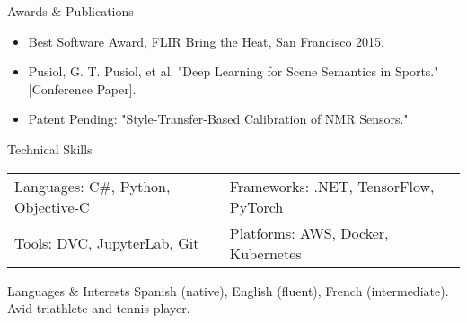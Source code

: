 \documentclass{resume}
\begin{document}
\begin{rSection}{Awards \& Publications}
\begin{itemize}
  \item Best Software Award, FLIR Bring the Heat, San Francisco 2015.
  \item Pusiol, G. T. Pusiol, et al. "Deep Learning for Scene Semantics in Sports." [Conference Paper].
  \item Patent Pending: "Style-Transfer-Based Calibration of NMR Sensors."
\end{itemize}
\end{rSection}

\begin{rSection}{Technical Skills}
\begin{tabular}{@{}p{2in}p{2in}@{}}
Languages: C#, Python, Objective-C & Frameworks: .NET, TensorFlow, PyTorch\\
Tools: DVC, JupyterLab, Git & Platforms: AWS, Docker, Kubernetes
\end{tabular}
\end{rSection}

\begin{rSection}{Languages \& Interests}
Spanish (native), English (fluent), French (intermediate). Avid triathlete and tennis player.
\end{rSection}
\end{document}
